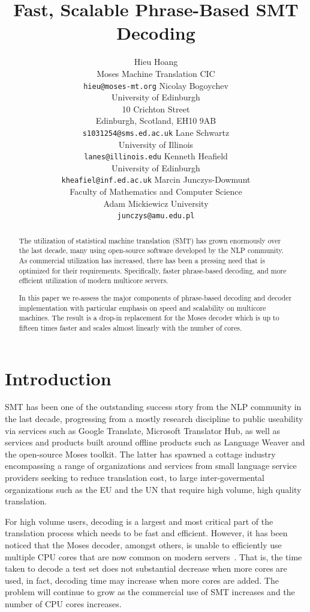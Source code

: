 \documentclass[11pt]{article}
\title{Fast, Scalable Phrase-Based SMT Decoding}
\author{Hieu Hoang\\
	    Moses Machine Translation CIC\\
	    {\tt hieu@moses-mt.org}
	  \And
	Nicolay Bogoychev\\
  	University of Edinburgh\\
  	10 Crichton Street\\
  	Edinburgh, Scotland, EH10 9AB\\
  {\tt s1031254@sms.ed.ac.uk}
	  \And
	Lane Schwartz\\
  	University of Illinois\\
  {\tt lanes@illinois.edu}
	  \AND
	Kenneth Heafield\\
  	University of Edinburgh\\
  {\tt kheafiel@inf.ed.ac.uk}
	  \And
	Marcin Junczys-Dowmunt\\
	Faculty of Mathematics and Computer Science \\
	Adam Mickiewicz University\\
  {\tt junczys@amu.edu.pl}
	}
\date{}
\begin{document}
\maketitle

\begin{abstract}
The utilization of statistical machine translation (SMT) has grown enormously over the last decade, many using open-source software developed by the NLP community. As commercial utilization has increased, there has been a pressing need that is optimized for their requirements. Specifically, faster phrase-based decoding, and more efficient utilization of modern multicore servers.

In this paper we re-assess the major components of phrase-based decoding and decoder implementation with particular emphasis on speed and scalability on multicore machines. The result is a drop-in replacement for the Moses decoder which is up to fifteen times faster and scales almost linearly with the number of cores. 

\end{abstract}

\section{Introduction}

SMT has been one of the outstanding success story from the NLP community in the last decade, progressing from a mostly research discipline to public useability via services such as Google Translate, Microsoft Translator Hub, as well as services and products built around offline products such as Language Weaver and the open-source Moses toolkit. The latter has spawned a cottage industry  encompassing a range of organizations and services from small language service providers seeking to reduce translation cost, to large inter-govermental organizations such as the EU and the UN that require high volume, high quality translation.

For high volume users, decoding is a largest and most critical part of the translation process which needs to be fast and efficient. However, it has been noticed that the Moses decoder, amongst others, is unable to efficiently use multiple CPU cores that are now common on modern servers~\cite{mfernandez2016boosting}. That is, the time taken to decode a test set does not substantial decrease when more cores are used, in fact, decoding time may increase when more cores are added. The problem will continue to grow as the commercial use of SMT increases and the number of CPU cores increases.
\end{document}
